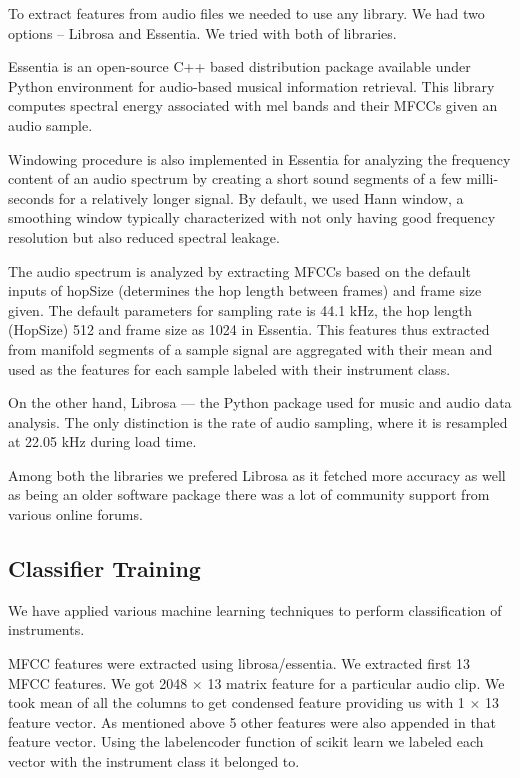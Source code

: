 \documentclass{article}
\begin{document}
To extract features from audio files we needed to use any library. We had two options -- Librosa\cite{mcfee2015librosa} and Essentia\cite{esen}. We tried with both of libraries. 


Essentia is  an open-source C++ based distribution package available under Python environment for audio-based musical information retrieval. This library computes spectral energy associated with mel bands and their MFCCs given an audio sample.

Windowing procedure is also implemented in Essentia for analyzing the frequency content of an audio spectrum by creating a short sound segments of a few milli-seconds for a relatively longer signal. By default, we used Hann window, a smoothing window typically characterized with not only having good frequency resolution but also reduced spectral leakage.

The audio spectrum is analyzed by extracting MFCCs based on the default inputs of hopSize (determines the hop length between frames) and frame size given. The default parameters for sampling rate is 44.1 kHz, the hop length (HopSize) 512 and frame size as 1024 in Essentia. This features thus extracted from manifold segments of a sample signal are aggregated with their mean and used as the features for each sample labeled with their instrument class.

On the other hand, Librosa --- the Python package used for music and audio data analysis. The only distinction  is the rate of audio sampling, where it is resampled at 22.05 kHz during load time.

Among both the libraries we prefered Librosa as it fetched more accuracy as well as being an older software package there was a lot of community support from various online forums. 

\subsection{Classifier Training}

We have applied various machine learning techniques to perform  classification of instruments.

MFCC features were extracted using librosa/essentia. We extracted first 13 MFCC features. We got 2048 $\times$ 13 matrix feature for a particular audio clip. We took mean of all the columns to get condensed feature providing us with 1 $\times$ 13 feature vector. As mentioned above 5 other features were also appended in that feature vector. Using the labelencoder function of scikit learn we labeled each vector with the instrument class it belonged to.
\end{document}
